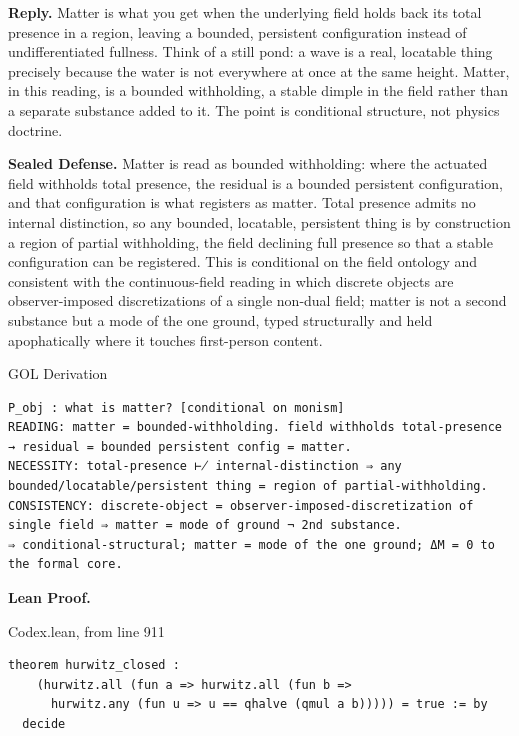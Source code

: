 \documentclass[10pt,twocolumn]{article}
\begin{document}
\textbf{Reply.} Matter is what you get when the underlying field holds
back its total presence in a region, leaving a bounded, persistent
configuration instead of undifferentiated fullness. Think of a still
pond: a wave is a real, locatable thing precisely because the water is
not everywhere at once at the same height. Matter, in this reading, is a
bounded withholding, a stable dimple in the field rather than a separate
substance added to it. The point is conditional structure, not physics
doctrine.

\textbf{Sealed Defense.} Matter is read as bounded withholding: where
the actuated field withholds total presence, the residual is a bounded
persistent configuration, and that configuration is what registers as
matter. Total presence admits no internal distinction, so any bounded,
locatable, persistent thing is by construction a region of partial
withholding, the field declining full presence so that a stable
configuration can be registered. This is conditional on the field
ontology and consistent with the continuous-field reading in which
discrete objects are observer-imposed discretizations of a single
non-dual field; matter is not a second substance but a mode of the one
ground, typed structurally and held apophatically where it touches
first-person content.

\begin{golbox}{GOL Derivation}
\begin{lstlisting}[style=golv]
P_obj : what is matter? [conditional on monism]
READING: matter = bounded-withholding. field withholds total-presence → residual = bounded persistent config = matter.
NECESSITY: total-presence ⊬ internal-distinction ⇒ any bounded/locatable/persistent thing = region of partial-withholding.
CONSISTENCY: discrete-object = observer-imposed-discretization of single field ⇒ matter = mode of ground ¬ 2nd substance.
⇒ conditional-structural; matter = mode of the one ground; ΔM = 0 to the formal core.
\end{lstlisting}
\end{golbox}

\textbf{Lean Proof.}

\begin{leanexcerpt}{Codex.lean, from line 911}
\begin{lstlisting}[style=leanx,firstnumber=911]
theorem hurwitz_closed :
    (hurwitz.all (fun a => hurwitz.all (fun b =>
      hurwitz.any (fun u => u == qhalve (qmul a b))))) = true := by
  decide
\end{lstlisting}
\end{leanexcerpt}
\end{document}
